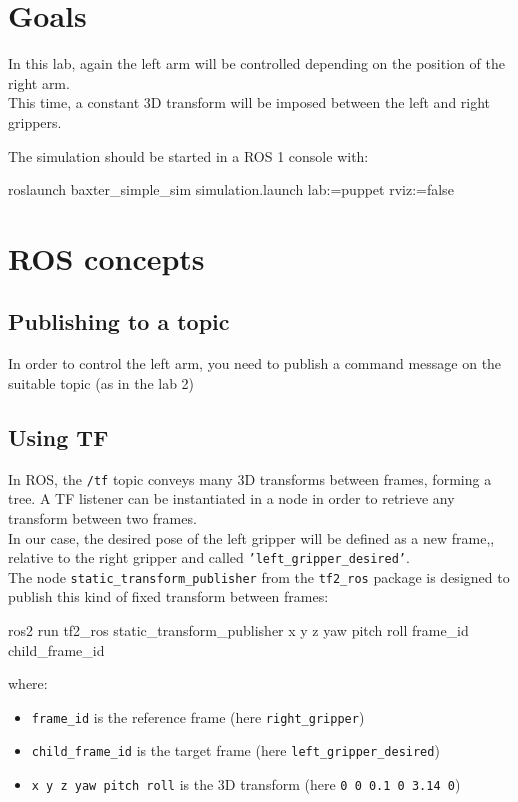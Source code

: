 \documentclass{ecnreport}
\author{O. Kermorgant}
\begin{document}


\section{Goals}

In this lab, again the left arm will be controlled depending on the position of the right arm.\\
This time, a constant 3D transform will be imposed between the left and right grippers. 

The simulation should be started in a ROS 1 console with:
\begin{bashcodelarge}
 roslaunch baxter_simple_sim simulation.launch lab:=puppet rviz:=false
\end{bashcodelarge}

\section{ROS concepts}

\subsection{Publishing to a topic}

In order to control the left arm, you need to publish a command message on the suitable topic (as in the lab 2)

\subsection{Using TF}

In ROS, the \texttt{/tf} topic conveys many 3D transforms between frames, forming a tree. A TF listener can be instantiated in a node in order to retrieve any transform between two frames. \\
In our case, the desired pose of the left gripper will be defined as a new frame,,  relative to the right gripper and called \texttt{'left\_gripper\_desired'}.\\
The node \texttt{static\_transform\_publisher} from the \texttt{tf2\_ros} package is designed to publish this kind of fixed transform between frames:
\begin{bashcodelarge}
 ros2 run tf2_ros static_transform_publisher x y z yaw pitch roll frame_id child_frame_id
\end{bashcodelarge}where:
\begin{itemize}
\item \texttt{frame\_id} is the reference frame (here \texttt{right\_gripper})
\item \texttt{child\_frame\_id} is the target frame (here \texttt{left\_gripper\_desired})
 \item \texttt{x y z yaw pitch roll} is the 3D transform (here \texttt{0 0 0.1 0 3.14 0})
\end{itemize}
\end{document}
